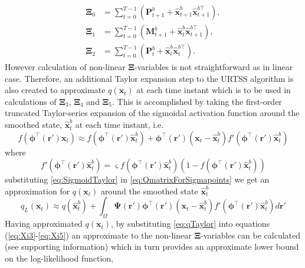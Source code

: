 \documentclass[]{article}
\begin{document}
\begin{align}
	\boldsymbol\Xi_{0}&=\sum_{t=0}^{T-1}\left(\mathbf P_{t+1}^b+\mathbf{\hat x}_{t+1}^b\mathbf{\hat x}_{t+1}^{b\top}\right)\label{eq:defofXi0}, \\
\boldsymbol\Xi_{1}&=\sum_{t=0}^{T-1}\left(\mathbf M_{t+1}^b+\mathbf{\hat x}_t^b\mathbf{\hat x}_{t+1}^{b\top}\right) \label{eq:defofXi1}, \\
\boldsymbol\Xi_{2}&=\sum_{t=0}^{T-1}\left(\mathbf P_t^b+\mathbf{\hat x}_t^b\mathbf{\hat x}_t^{b\top}\right).
 \end{align}
However calculation of non-linear $\boldsymbol\Xi$-variables is not straightforward as in linear case. Therefore, an additional  Taylor expansion step to the URTSS algorithm is also created to approximate $q(\mathbf{x}_t)$ at each time instant which is to be used in  calculations of $\boldsymbol\Xi_3$, $\boldsymbol\Xi_4$ and $\boldsymbol\Xi_5$. This is accomplished by taking the first-order truncated Taylor-series expansion of the sigmoidal activation function  around the smoothed state, $\hat{\mathbf x}_t^b$ at each time instant, i.e.
\begin{equation}\label{eq:SigmoidTaylor}
 f\left(\boldsymbol \phi^\top\left(\mathbf r'\right)\mathbf x_t\right) \approx f\left(\boldsymbol \phi^\top(\mathbf r')\hat{\mathbf x}_t^b\right)+  \boldsymbol \phi^\top\left(\mathbf r'\right)\left(\mathbf x_t - \hat{\mathbf x}_t^b\right)f'\left(\boldsymbol \phi^\top\left(\mathbf r'\right)\hat{\mathbf x}_t^b\right)
\end{equation}
where 
\begin{equation}\label{eq:SigmoidDerivative}
 f'\left(\boldsymbol \phi^\top\left(\mathbf r'\right)\hat{\mathbf x}_t^b\right)=\varsigma f\left(\boldsymbol \phi^\top\left(\mathbf r'\right)\hat{\mathbf x}_t^b\right)\left( 1-f\left( \boldsymbol \phi^\top\left(\mathbf r'\right)\hat{\mathbf x}_t^b\right)\right)
\end{equation}
substituting \eqref{eq:SigmoidTaylor} in \eqref{eq:QmatrixForSigmapoints}  we get an approximation for $q(\mathbf x_t)$ around the smoothed state $\hat{\mathbf{x}}_t^b$ 
\begin{equation}\label{eq:qTaylor}
 q_L(\mathbf x_t) \approx q\left(\hat{\mathbf x}_t^b\right)+\int_\Omega \boldsymbol{\Psi}\left(\mathbf{r}'\right)\boldsymbol \phi^\top\left(\mathbf r'\right) \left(\mathbf x_t -\hat{\mathbf x}_t^b\right)f'\left(\boldsymbol \phi^\top\left(\mathbf r'\right)\hat{\mathbf x}_t^b\right) d\mathbf{r}'
\end{equation}
Having approximated $q\left(\mathbf x_t\right)$, by substituting  \eqref{eq:qTaylor} into equations (\ref{eq:Xi3}-\ref{eq:Xi5}) an approximate to the non-linear $\boldsymbol\Xi$-variables can be calculated (see supporting information) which in turn provides an approximate lower bound on the log-likelihood function, 
\end{document}
